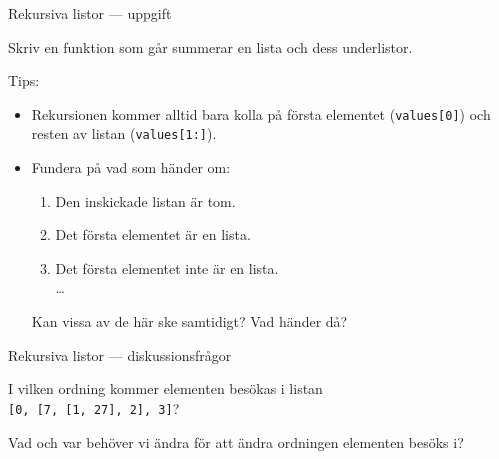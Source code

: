 \documentclass{beamer}
\begin{document}

  \begin{frame}[fragile]{Rekursiva listor --- uppgift}

    Skriv en funktion som går summerar en lista och dess underlistor.

    Tips:

    \vspace{-1em}

    \begin{itemize}

      \item Rekursionen kommer alltid bara kolla på första elementet
      (\texttt{values[0]}) och resten av listan (\texttt{values[1:]}).

      \item Fundera på vad som händer om:

      \begin{enumerate}
        \item Den inskickade listan är tom.
        \item Det första elementet är en lista.
        \item Det första elementet inte är en lista. \\
        \dots{}
      \end{enumerate}

      Kan vissa av de här ske samtidigt? Vad händer då?

    \end{itemize}

  \end{frame}

  \begin{frame}{Rekursiva listor --- diskussionsfrågor}

    I vilken ordning kommer elementen besökas i listan \\ \texttt{[0, [7, [1, 27], 2], 3]}?

    Vad och var behöver vi ändra för att ändra ordningen elementen besöks i?

  \end{frame}
\end{document}
